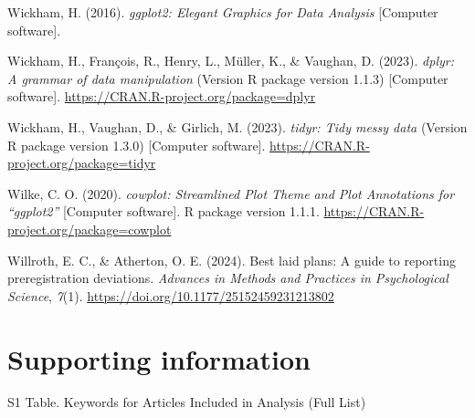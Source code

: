 \documentclass[authordate, empirical]{jote-new-article}
\begin{document}
	Wickham, H. (2016). \emph{ggplot2: Elegant Graphics for Data Analysis} [Computer software].



	Wickham, H., François, R., Henry, L., Müller, K., \& Vaughan, D. (2023). \emph{dplyr: A grammar of data manipulation} (Version R package version 1.1.3) [Computer software]. \url{https://CRAN.R-project.org/package=dplyr}



	Wickham, H., Vaughan, D., \& Girlich, M. (2023). \emph{tidyr: Tidy messy data} (Version R package version 1.3.0) [Computer software]. \url{https://CRAN.R-project.org/package=tidyr}



	Wilke, C. O. (2020). \emph{cowplot: Streamlined Plot Theme and Plot Annotations for “ggplot2”} [Computer software]. R package version 1.1.1. \url{https://CRAN.R-project.org/package=cowplot}



	Willroth, E. C., \& Atherton, O. E. (2024). Best laid plans: A guide to reporting preregistration deviations. \emph{Advances in Methods and Practices in Psychological Science}, \emph{7}(1). \url{https://doi.org/10.1177/25152459231213802}











	\section{\textbf{Supporting information}}







	S1 Table. Keywords for Articles Included in Analysis (Full List)
\end{document}
